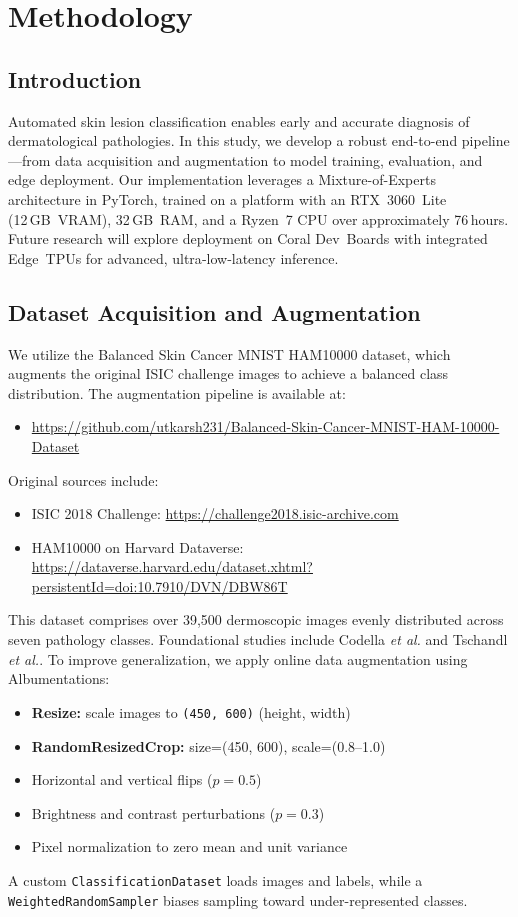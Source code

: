 \chapter{Methodology}
\clearpage

\section{Introduction}
Automated skin lesion classification enables early and accurate diagnosis of dermatological pathologies. In this study, we develop a robust end-to-end pipeline—from data acquisition and augmentation to model training, evaluation, and edge deployment. Our implementation leverages a Mixture-of-Experts architecture in PyTorch, trained on a platform with an RTX 3060 Lite (12 GB VRAM), 32 GB RAM, and a Ryzen 7 CPU over approximately 76 hours. Future research will explore deployment on Coral Dev Boards with integrated Edge TPUs for advanced, ultra‑low‑latency inference.

\section{Dataset Acquisition and Augmentation}
We utilize the Balanced Skin Cancer MNIST HAM10000 dataset, which augments the original ISIC challenge images to achieve a balanced class distribution. The augmentation pipeline is available at:
\begin{itemize}
\item \url{https://github.com/utkarsh231/Balanced-Skin-Cancer-MNIST-HAM-10000-Dataset}
\end{itemize}
Original sources include:
\begin{itemize}
\item ISIC 2018 Challenge: \url{https://challenge2018.isic-archive.com}
\item HAM10000 on Harvard Dataverse: \url{https://dataverse.harvard.edu/dataset.xhtml?persistentId=doi:10.7910/DVN/DBW86T}
\end{itemize}
This dataset comprises over 39,500 dermoscopic images evenly distributed across seven pathology classes. Foundational studies include Codella \emph{et al.}\cite{codella2018skin} and Tschandl \emph{et al.}\cite{tschandl2018ham10000}. To improve generalization, we apply online data augmentation using Albumentations:
\begin{itemize}
\item \textbf{Resize:} scale images to \texttt{(450, 600)} (height, width)
\item \textbf{RandomResizedCrop:} size=(450, 600), scale=(0.8--1.0)
\item Horizontal and vertical flips ($p=0.5$)
\item Brightness and contrast perturbations ($p=0.3$)
\item Pixel normalization to zero mean and unit variance
\end{itemize}
A custom \texttt{ClassificationDataset} loads images and labels, while a \texttt{WeightedRandomSampler} biases sampling toward under-represented classes.

